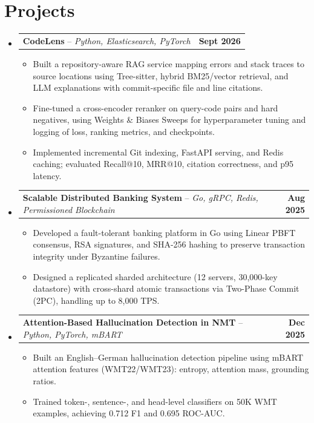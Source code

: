 \documentclass[letterpaper,11pt]{article}
\makeatletter
\newcommand{\resumeItem}[1]{
  \item\small{
    {#1 \vspace{-2pt}}
  }
}
\newcommand{\resumeProjectHeading}[2]{
    \item
    \begin{tabular*}{1.001\textwidth}{l@{\extracolsep{\fill}}r}
      \small#1 & \textbf{\small #2}\\
    \end{tabular*}\vspace{-7pt}
}
\newcommand{\resumeSubHeadingListStart}{\begin{itemize}[leftmargin=0.0in, label={}]}
\newcommand{\resumeSubHeadingListEnd}{\end{itemize}}
\newcommand{\resumeItemListStart}{\begin{itemize}}
\newcommand{\resumeItemListEnd}{\end{itemize}\vspace{-5pt}}
\makeatother
\begin{document}
\section{Projects}
    \vspace{-5pt}
    \resumeSubHeadingListStart

      \resumeProjectHeading
          {\textbf{CodeLens} -- \emph{Python, Elasticsearch, PyTorch}}{\textbf{Sept 2026}}
          \resumeItemListStart
            \resumeItem{Built a repository-aware RAG service mapping errors and stack traces to source locations using Tree-sitter, hybrid BM25/vector retrieval, and LLM explanations with commit-specific file and line citations.}
            \resumeItem{Fine-tuned a cross-encoder reranker on query-code pairs and hard negatives, using Weights \& Biases Sweeps for hyperparameter tuning and logging of loss, ranking metrics, and checkpoints.}
            \resumeItem{Implemented incremental Git indexing, FastAPI serving, and Redis caching; evaluated Recall@10, MRR@10, citation correctness, and p95 latency.}
          \resumeItemListEnd
          \vspace{-13pt}

      \resumeProjectHeading
          {\textbf{Scalable Distributed Banking System} -- \emph{Go, gRPC, Redis, Permissioned Blockchain}}{\textbf{Aug 2025}}
          \resumeItemListStart
            \resumeItem{Developed a fault-tolerant banking platform in Go using Linear PBFT consensus, RSA signatures, and SHA-256 hashing to preserve transaction integrity under Byzantine failures.}
            \resumeItem{Designed a replicated sharded architecture (12 servers, 30,000-key datastore) with cross-shard atomic transactions via Two-Phase Commit (2PC), handling up to 8,000 TPS.}
          \resumeItemListEnd
          \vspace{-13pt}

      \resumeProjectHeading
          {\textbf{Attention-Based Hallucination Detection in NMT} -- \emph{Python, PyTorch, mBART}}{\textbf{Dec 2025}}
          \resumeItemListStart
            \resumeItem{Built an English--German hallucination detection pipeline using mBART attention features (WMT22/WMT23): entropy, attention mass, grounding ratios.}
            \resumeItem{Trained token-, sentence-, and head-level classifiers on 50K WMT examples, achieving 0.712 F1 and 0.695 ROC-AUC.}
          \resumeItemListEnd
          \vspace{-13pt}

    \resumeSubHeadingListEnd
\end{document}
